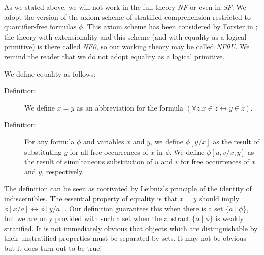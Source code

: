 \documentclass{article}
\begin{document}
As we stated above, we will not work in the full theory {\em NF\/} or
even in {\em SF\/}.  We adopt the version of the axiom scheme of
stratified comprehension restricted to quantifier-free formulas
$\phi$.  This axiom scheme has been considered by Forster in
\cite{nfo}; the theory with extensionality and this scheme 
(and with equality as a logical primitive) is there called {\em
NF0\/}, so our working theory may be called {\em NF0U\/}.  We remind
the reader that we do not adopt equality as a logical primitive.

We define equality as follows:

\begin{description}

\item[Definition:]  We define $x=y$ as an abbreviation for the formula $(\forall z.x \in z \leftrightarrow y \in z)$.

\item[Definition:]  
For any formula $\phi$ and variables $x$ and $y$, we define
$\phi[y/x]$ as the result of substituting $y$ for all free occurrences
of $x$ in $\phi$.  We define $\phi[u,v/x,y]$ as the result of
simultaneous substitution of $u$ and $v$ for free occurrences of $x$
and $y$, respectively.

\end{description}

The definition can be seen as motivated by Leibniz's principle of the
identity of indiscernibles.  The essential property of equality is
that $x = y$ should imply $\phi[x/a]
\leftrightarrow
\phi[y/a]$.  Our definition guarantees this when there is a set $\{a
\mid \phi\}$, but we are only provided with such a set when the abstract $\{a
\mid \phi\}$ is weakly stratified.  
It is not immediately obvious that objects which are distinguishable
by their unstratified properties must be separated by sets.  It may
not be obvious -- but it does turn out to be true!
\end{document}
